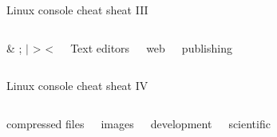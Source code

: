 \documentclass{beamer}
\begin{document}
\begin{frame}[fragile]{Linux console cheat sheat III}
  \fontsize{7pt}{7}\selectfont
  \begin{columns}
    \begin{block}{\& ; $|$ > <}
      
    \end{block}
    \begin{block}{Text editors}
      
    \end{block}

    \begin{block}{web}
      
    \end{block}
    \begin{block}{publishing}
      
    \end{block}
  \end{columns}
\end{frame}

\begin{frame}[fragile]{Linux console cheat sheat IV}
  \fontsize{7pt}{7}\selectfont
  \begin{columns}
    \begin{block}{compressed files}
      
    \end{block}
    \begin{block}{images}
      
    \end{block}

    \begin{block}{development}
      
    \end{block}
    \begin{block}{scientific}
      
    \end{block}
  \end{columns}
\end{frame}
\end{document}
